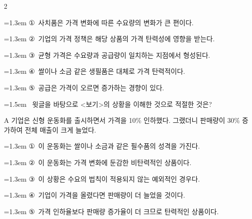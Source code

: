 \documentclass[10pt, a4paper]{article}
\begin{document}
\begin{multicols}{2}
\begin{minipage}{\columnwidth}
\vspace{0.5mm}
{\hangindent=1.3em  \noindent\hspace{0.3em}①~사치품은 가격 변화에 따른 수요량의 변화가 큰 편이다.\par}
{\hangindent=1.3em  \noindent\hspace{0.3em}②~기업의 가격 정책은 해당 상품의 가격 탄력성에 영향을 받는다.\par}
{\hangindent=1.3em  \noindent\hspace{0.3em}③~균형 가격은 수요량과 공급량이 일치하는 지점에서 형성된다.\par}
{\hangindent=1.3em  \noindent\hspace{0.3em}④~쌀이나 소금 같은 생필품은 대체로 가격 탄력적이다.\par}
{\hangindent=1.3em  \noindent\hspace{0.3em}⑤~공급은 가격이 오르면 증가하는 경향이 있다.\par}
\vspace{4mm}
\end{minipage}
\par

\noindent\begin{minipage}{\columnwidth}
\vspace{2mm}
{\hangindent=1.5em  ~윗글을 바탕으로 <보기>의 상황을 이해한 것으로 적절한 것은?\par}

\vspace{1mm}
\begin{boxibox}
A 기업은 신형 운동화를 출시하면서 가격을 10\% 인하했다. 그랬더니 판매량이 30\% 증가하여 전체 매출이 크게 늘었다. \\
\end{boxibox}
\vspace{1mm}

\vspace{0.5mm}
{\hangindent=1.3em  \noindent\hspace{0.3em}①~이 운동화는 쌀이나 소금과 같은 필수품의 성격을 가진다.\par}
{\hangindent=1.3em  \noindent\hspace{0.3em}②~이 운동화는 가격 변화에 둔감한 비탄력적인 상품이다.\par}
{\hangindent=1.3em  \noindent\hspace{0.3em}③~이 상황은 수요의 법칙이 적용되지 않는 예외적인 경우다.\par}
{\hangindent=1.3em  \noindent\hspace{0.3em}④~기업이 가격을 올렸다면 판매량이 더 늘었을 것이다.\par}
{\hangindent=1.3em  \noindent\hspace{0.3em}⑤~가격 인하율보다 판매량 증가율이 더 크므로 탄력적인 상품이다.\par}
\vspace{4mm}
\end{minipage}
\par


\end{multicols}
\end{document}

